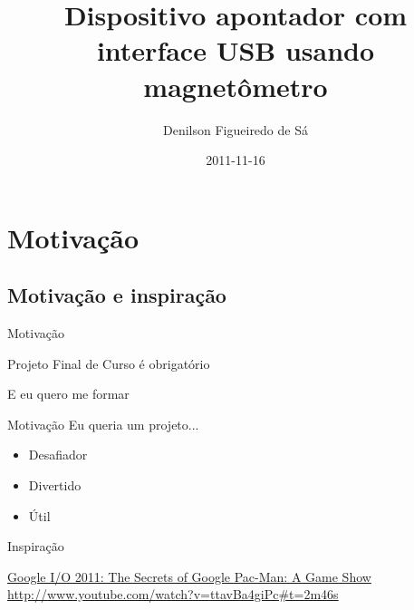 \documentclass{beamer}
\title{Dispositivo apontador com interface USB usando magnetômetro}
\author{Denilson Figueiredo de Sá}
\date{2011-11-16}
\institute{DCC/UFRJ}
\begin{document}
\begin{frame}
	\titlepage
\end{frame}


\section{Motivação}

\subsection{Motivação e inspiração}

\begin{frame}{Motivação}
	\begin{center}
		\pause
		\Large{Projeto Final de Curso é obrigatório}

		\pause
		\bigskip

		\Large{E eu quero me formar}
	\end{center}
\end{frame}


\begin{frame}{Motivação}
	Eu queria um projeto...
	\pause
	\begin{itemize}[<+->]
		\item Desafiador
		\item Divertido
		\item Útil
	\end{itemize}
\end{frame}


\begin{frame}{Inspiração}
	\pause
	\begin{center}
		\href{http://www.youtube.com/watch?v=ttavBa4giPc\#t=2m46s}{Google I/O 2011: The Secrets of Google Pac-Man: A Game Show}
		\url{http://www.youtube.com/watch?v=ttavBa4giPc\#t=2m46s}
	\end{center}
\end{frame}
\end{document}
